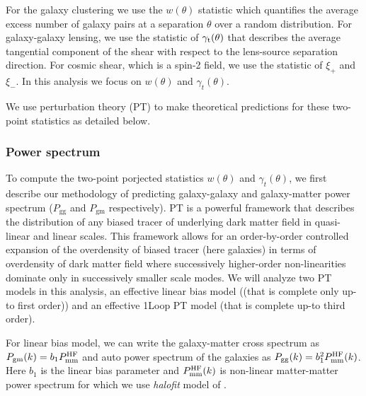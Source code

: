 \documentclass[fleqn,usenatbib]{mnras}
\newcommand{\gammat}{\ensuremath{\gamma_{t}(\theta)}}
\newcommand{\wtheta}{\ensuremath{w(\theta)}}
\newcommand{\pgg}{\ensuremath{P_{\mathrm{gg}}}}
\newcommand{\pgm}{\ensuremath{P_{\mathrm{gm}}}}
\begin{document}
For the galaxy clustering we use the $w(\theta)$ statistic which quantifies the average excess number of galaxy pairs at a separation $\theta$ over a random distribution. For galaxy-galaxy lensing, we use the statistic of $\gamma_{\rm t}(\theta)$ that describes the average tangential component of the shear with respect to the lens-source separation direction. For cosmic shear, which is a spin-2 field, we use the statistic of $\xi_{+}$ and $\xi_{-}$. In this analysis we focus on $\wtheta$ and $\gammat$. 

We use perturbation theory (PT) to make theoretical predictions for these two-point statistics as detailed below. 

\subsubsection{Power spectrum}
\label{sec:Pk_pred}

To compute the two-point porjected statistics $\wtheta$ and $\gammat$, we first describe our methodology of predicting galaxy-galaxy and galaxy-matter power spectrum ($\pgg$ and $\pgm$ respectively). PT is a powerful framework that describes the distribution of any biased tracer of underlying dark matter field in quasi-linear and linear scales. This framework allows for an order-by-order controlled expansion of the overdensity of biased tracer (here galaxies) in terms of overdensity of dark matter field where successively higher-order non-linearities dominate only in successively smaller scale modes. We will analyze two PT models in this analysis, an effective linear bias model ((that is complete only up-to first order)) and an effective 1Loop PT model (that is complete up-to third order). 

For linear bias model, we can write the galaxy-matter cross spectrum as $P_{\mathrm{gm}}(k) = b_1 P^{\rm HF}_{\mathrm{mm}}$ and auto power spectrum of the galaxies as $P_{\mathrm{gg}}(k) = b_1^2 P^{\rm HF}_{\mathrm{mm}}(k)$. Here $b_1$ is the linear bias parameter and $P^{\rm HF}_{\mathrm{mm}}(k)$ is non-linear matter-matter power spectrum for which we use \textit{halofit} model of \cite{Takahashi:2012em}. 
\end{document}
